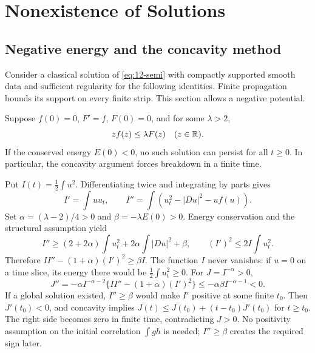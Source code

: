 \section{Nonexistence of Solutions}
\label{sec:12-5}
\subsection{Negative energy and the concavity method}
Consider a classical solution of \eqref{eq:12-semi} with compactly
supported smooth data and sufficient regularity for the following
identities. Finite propagation bounds its support on every finite
strip. This section allows a negative potential.
\begin{theorem}
Suppose $f(0)=0$, $F'=f$, $F(0)=0$, and for some $\lambda>2$,
\[
 zf(z)\le\lambda F(z)\quad(z\in\mathbb{R}).
\]
If the conserved energy $E(0)<0$, no such solution can persist for
all $t\ge0$. In particular, the concavity argument forces breakdown
in a finite time.
\end{theorem}
\begin{expandedproof}
Put $I(t)=\frac12\int u^2$. Differentiating twice and integrating
by parts gives
\[
 I'=\int uu_t,\qquad I''=\int(u_t^2-|Du|^2-uf(u)).
\]
Set $\alpha=(\lambda-2)/4>0$ and $\beta=-\lambda E(0)>0$.
Energy conservation and the structural assumption yield
\[
 I''\ge(2+2\alpha)\int u_t^2+2\alpha\int|Du|^2+\beta,
 \qquad (I')^2\le2I\int u_t^2.
\]
Therefore $II''-(1+\alpha)(I')^2\ge\beta I$.
The function $I$ never vanishes: if $u=0$ on a time slice, its
energy there would be $\frac12\int u_t^2\ge0$.
For $J=I^{-\alpha}>0$,
\begin{equation}\label{eq:12-concavity}
 J''=-\alpha I^{-\alpha-2}
       \{II''-(1+\alpha)(I')^2\}
       \le-\alpha\beta I^{-\alpha-1}<0.
\end{equation}
If a global solution existed, $I''\ge\beta$ would make $I'$ positive
at some finite $t_0$. Then $J'(t_0)<0$, and concavity implies
$J(t)\le J(t_0)+(t-t_0)J'(t_0)$ for $t\ge t_0$.
The right side becomes zero in finite time, contradicting $J>0$.
No positivity assumption on the initial correlation $\int gh$ is
needed; $I''\ge\beta$ creates the required sign later.
\end{expandedproof}

